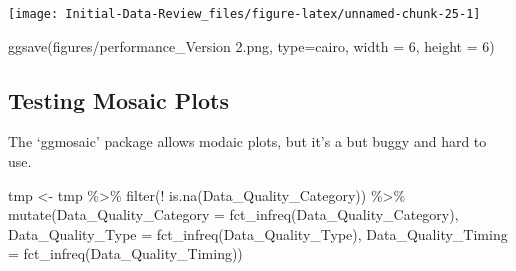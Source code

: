 \documentclass[
]{article}
\newenvironment{Shaded}{\begin{snugshade}}{\end{snugshade}}
\newcommand{\AttributeTok}[1]{\textcolor[rgb]{0.77,0.63,0.00}{#1}}
\newcommand{\DecValTok}[1]{\textcolor[rgb]{0.00,0.00,0.81}{#1}}
\newcommand{\FunctionTok}[1]{\textcolor[rgb]{0.00,0.00,0.00}{#1}}
\newcommand{\NormalTok}[1]{#1}
\newcommand{\OtherTok}[1]{\textcolor[rgb]{0.56,0.35,0.01}{#1}}
\newcommand{\SpecialCharTok}[1]{\textcolor[rgb]{0.00,0.00,0.00}{#1}}
\newcommand{\StringTok}[1]{\textcolor[rgb]{0.31,0.60,0.02}{#1}}
\begin{document}
\begin{center}\texttt{[image: Initial-Data-Review\_files/figure-latex/unnamed-chunk-25-1]} \end{center}

\begin{Shaded}
\begin{Highlighting}[]
\FunctionTok{ggsave}\NormalTok{(}\StringTok{\textquotesingle{}figures/performance\_Version 2.png\textquotesingle{}}\NormalTok{, }\AttributeTok{type=}\StringTok{\textquotesingle{}cairo\textquotesingle{}}\NormalTok{,}
         \AttributeTok{width =} \DecValTok{6}\NormalTok{, }\AttributeTok{height =} \DecValTok{6}\NormalTok{)}
\end{Highlighting}
\end{Shaded}

\hypertarget{testing-mosaic-plots}{%
\subsection{Testing Mosaic Plots}\label{testing-mosaic-plots}}

The `ggmosaic' package allows modaic plots, but it's a but buggy and
hard to use.

\begin{Shaded}
\begin{Highlighting}[]
\NormalTok{tmp }\OtherTok{\textless{}{-}}\NormalTok{ tmp }\SpecialCharTok{\%\textgreater{}\%}
  \FunctionTok{filter}\NormalTok{(}\SpecialCharTok{!} \FunctionTok{is.na}\NormalTok{(Data\_Quality\_Category))  }\SpecialCharTok{\%\textgreater{}\%}
  \FunctionTok{mutate}\NormalTok{(}\AttributeTok{Data\_Quality\_Category =} \FunctionTok{fct\_infreq}\NormalTok{(Data\_Quality\_Category),}
         \AttributeTok{Data\_Quality\_Type =} \FunctionTok{fct\_infreq}\NormalTok{(Data\_Quality\_Type),}
         \AttributeTok{Data\_Quality\_Timing =} \FunctionTok{fct\_infreq}\NormalTok{(Data\_Quality\_Timing))}
\end{Highlighting}
\end{Shaded}
\end{document}
